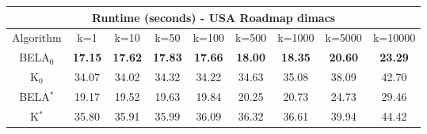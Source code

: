 \begin{tabular}{c|cccccccc}\toprule
\multicolumn{9}{c}{Runtime (seconds) - USA Roadmap dimacs}\\ \midrule
Algorithm & k=1 & k=10 & k=50 & k=100 & k=500 & k=1000 & k=5000 & k=10000 \\ \midrule
BELA$_0$ & \textbf{17.15} & \textbf{17.62} & \textbf{17.83} & \textbf{17.66} & \textbf{18.00} & \textbf{18.35} & \textbf{20.60} & \textbf{23.29} \\
K$_0$ & 34.07 & 34.02 & 34.32 & 34.22 & 34.63 & 35.08 & 38.09 & 42.70 \\
BELA$^*$ & 19.17 & 19.52 & 19.63 & 19.84 & 20.25 & 20.73 & 24.73 & 29.46 \\
K$^*$ & 35.80 & 35.91 & 35.99 & 36.09 & 36.32 & 36.61 & 39.94 & 44.42 \\ \bottomrule 
\end{tabular}
